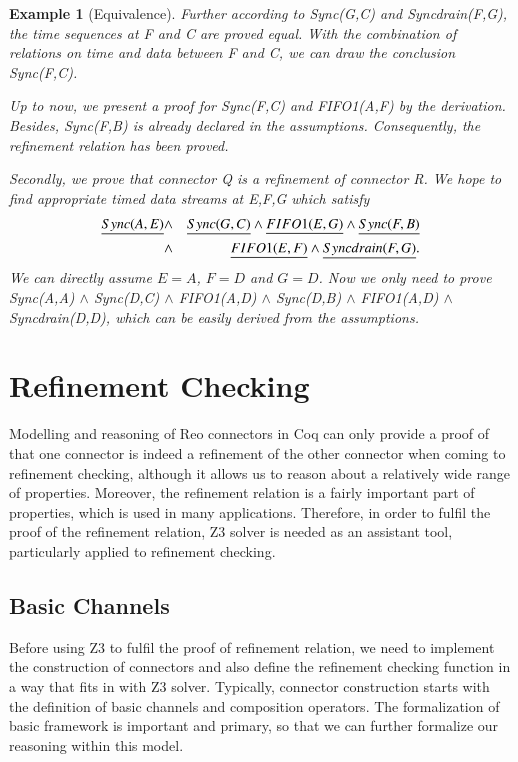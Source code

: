\documentclass[3p,times]{elsarticle}
\newtheorem{example}{Example}[section]
\begin{document}
\begin{example}[Equivalence]
Further according to \emph{Sync(G,C)} and \emph{Syncdrain(F,G)}, the time sequences at \emph{F} and \emph{C} are proved equal. With the combination of relations on time and data between \emph{F} and \emph{C}, we can draw the conclusion \emph{Sync(F,C)}.


Up to now, we present a proof for \emph{Sync(F,C)} and \emph{FIFO1(A,F)} by the derivation. Besides, \emph{Sync(F,B)} is already declared in the assumptions. Consequently, the refinement relation has been proved.

Secondly, we prove that connector \emph{Q} is a refinement of connector \emph{R}.
We hope to find appropriate timed data streams at \emph{E,F,G}  which satisfy
\begin{eqnarray*}
\emph{Sync(A,E)}&\wedge& \emph{Sync(G,C)} \wedge \emph{FIFO1(E,G)}\wedge \emph{Sync(F,B)}\\
 &\wedge& \emph{FIFO1(E,F)}\wedge \emph{Syncdrain(F,G)}.
\end{eqnarray*}
We can directly assume $E=A$, $F=D$ and $G=D$. Now we only need to prove
\emph{Sync(A,A)} $\wedge$  \emph{Sync(D,C)}  $\wedge$  \emph{FIFO1(A,D)} $\wedge$  \emph{Sync(D,B)} $\wedge$ \emph{FIFO1(A,D)} $\wedge$ \emph{Syncdrain(D,D)}, which can be easily derived from the assumptions.
\end{example}

\section{Refinement Checking} \label{sec:refinement}
Modelling and reasoning of Reo connectors in Coq can only provide a proof of that one connector is indeed a refinement of the other connector when coming to refinement checking, although it allows us to reason about a relatively wide range of properties. Moreover, the refinement relation is a fairly important part of properties, which is used in many applications. Therefore, in order to fulfil the proof of the refinement relation, Z3 solver is needed as an assistant tool, particularly applied to refinement checking.
\subsection{Basic Channels}
Before using Z3 to fulfil the proof of refinement relation, we need to implement the construction of connectors and also define the refinement checking function in a way that fits in with Z3 solver. Typically, connector construction starts with the definition of basic channels and composition operators. The formalization of basic framework is important and primary, so that we can further formalize our reasoning within this model.
\end{document}
